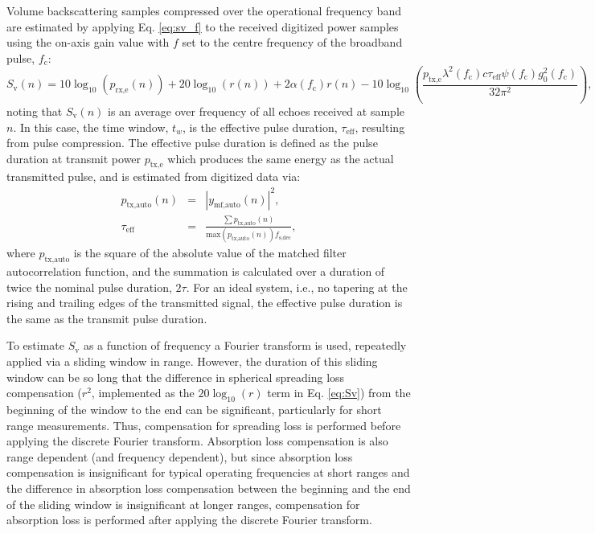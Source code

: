 \documentclass[preprint,12pt,TurnOnLineNumbers]{JASAnew}
\newcommand{\samplesymt}{n}
\newcommand{\fsdec}{f_{\textrm{s,dec}}}
\newcommand{\fc}{f_{\textrm{c}}}
\newcommand{\ptxe}{p_{\textrm{tx,e}}}
\newcommand{\prxe}{p_{\textrm{rx,e}}}
\newcommand{\tnom}{\tau}
\newcommand{\teff}{\tau_{\textrm{eff}}}
\newcommand{\ymfauto}{y_{\textrm{mf,auto}}}
\newcommand{\ptxauto}{p_{\textrm{tx,auto}}}
\newcommand{\tslide}{t_w}
\newcommand{\sv}{S_{\textrm{v}}}
\newcommand{\range}{r}
\newcommand{\gainzero}{g_0}
\newcommand{\eqang}{\psi}
\newcommand{\wlen}{\lambda}
\newcommand{\cw}{c}
\newcommand{\absorp}{\alpha}
\begin{document}
Volume backscattering samples compressed over the operational frequency band are estimated by applying Eq. \ref{eq:sv_f} to the received digitized power samples using the on-axis gain value with $f$ set to the centre frequency of the broadband pulse, $\fc$:
\begin{equation}
\label{eq:Sv}
\sv(\samplesymt)  =  10\log_{10}(\prxe(\samplesymt)) + 20\log_{10}(\range(\samplesymt)) + 2\absorp(\fc)\range(\samplesymt) 
- 10\log_{10}\left( \frac{\ptxe \wlen^2(\fc) \cw \teff \eqang(\fc) \gainzero^2(\fc)}{32\pi^2} \right),
\end{equation}
noting that $\sv(\samplesymt)$ is an average over frequency of all echoes received at sample $\samplesymt$. In this case, the time window, $\tslide$, is the effective pulse duration, $\teff$, resulting from pulse compression. The effective pulse duration is defined as the pulse duration at transmit power $\ptxe$ which produces the same energy as the actual transmitted pulse, and is estimated from digitized data via:
%
\begin{eqnarray}
\label{eq:TauEff}
\ptxauto(\samplesymt) & = & |\ymfauto(\samplesymt)|^2,\\
\teff & = & \frac{\sum \ptxauto(\samplesymt)}{\textrm{max}(\ptxauto(\samplesymt))\fsdec},
\end{eqnarray}
where $\ptxauto$ is the square of the absolute value of the matched filter autocorrelation function, and the summation is calculated over a duration of twice the nominal pulse duration, $2\tnom$. For an ideal system, i.e., no tapering at the rising and trailing edges of the transmitted signal, the effective pulse duration is the same as the transmit pulse duration.

To estimate $\sv$ as a function of frequency a Fourier transform is used, repeatedly applied via a sliding window in range. However, the duration of this sliding window can be so long that the difference in spherical spreading loss compensation ($r^2$, implemented as the $20\log_{10}(\range)$ term in Eq. \ref{eq:Sv}) from the beginning of the window to the end can be significant, particularly for short range measurements. Thus, compensation for spreading loss is performed before applying the discrete Fourier transform. Absorption loss compensation is also range dependent (and frequency dependent), but since absorption loss compensation is insignificant for typical operating frequencies at short ranges and the difference in absorption loss compensation between the beginning and the end of the sliding window is insignificant at longer ranges, compensation for absorption loss is performed after applying the discrete Fourier transform.
\end{document}
